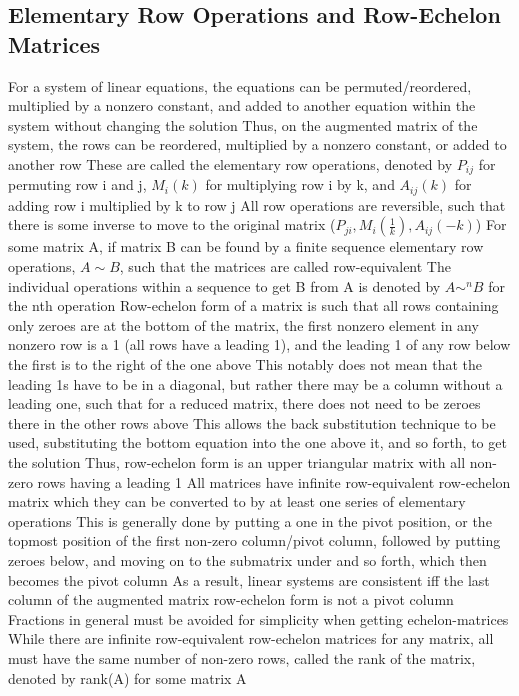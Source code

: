 \documentclass[11 pt, twoside]{article}
\newenvironment{outline*}
{
	\begin{outline}[enumerate]
	}
	{\end{outline}
}
\begin{document}
\subsection{Elementary Row Operations and Row-Echelon Matrices}
\begin{outline*}
\1 For a system of linear equations, the equations can be permuted/reordered, multiplied by a nonzero constant, and added to another equation within the system without changing the solution
\2 Thus, on the augmented matrix of the system, the rows can be reordered, multiplied by a nonzero constant, or added to another row
\2 These are called the elementary row operations, denoted by $P_{ij}$ for permuting row i and j, $M_i(k)$ for multiplying row i by k, and $A_{ij}(k)$ for adding row i multiplied by k to row j
\3 All row operations are reversible, such that there is some inverse to move to the original matrix ($P_{ji}, M_i(\frac{1}{k}), A_{ij}(-k)$)
\2 For some matrix A, if matrix B can be found by a finite sequence elementary row operations, $A \sim B$, such that the matrices are called row-equivalent
\3 The individual operations within a sequence to get B from A is denoted by $A \sim^n B$ for the nth operation
\1 Row-echelon form of a matrix is such that all rows containing only zeroes are at the bottom of the matrix, the first nonzero element in any nonzero row is a 1 (all rows have a leading 1), and the leading 1 of any row below the first is to the right of the one above
\2 This notably does not mean that the leading 1s have to be in a diagonal, but rather there may be a column without a leading one, such that for a reduced matrix, there does not need to be zeroes there in the other rows above
\2 This allows the back substitution technique to be used, substituting the bottom equation into the one above it, and so forth, to get the solution
\2 Thus, row-echelon form is an upper triangular matrix with all non-zero rows having a leading 1
\1 All matrices have infinite row-equivalent row-echelon matrix which they can be converted to by at least one series of elementary operations
\2 This is generally done by putting a one in the pivot position, or the topmost position of the first non-zero column/pivot column, followed by putting zeroes below, and moving on to the submatrix under and so forth, which then becomes the pivot column
\3 As a result, linear systems are consistent iff the last column of the augmented matrix row-echelon form is not a pivot column
\2 Fractions in general must be avoided for simplicity when getting echelon-matrices
\1 While there are infinite row-equivalent row-echelon matrices for any matrix, all must have the same number of non-zero rows, called the rank of the matrix, denoted by rank(A) for some matrix A

\end{outline*}
\end{document}
